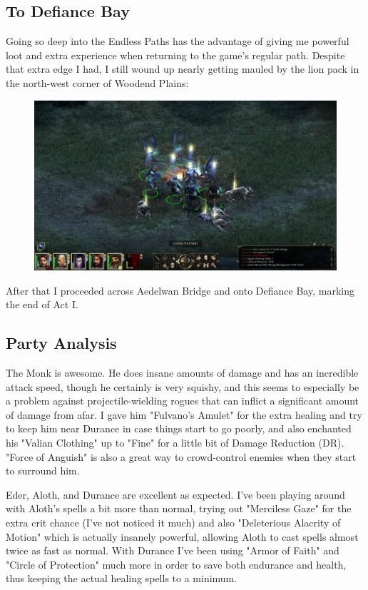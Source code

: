 \documentclass{article}
\begin{document}
\subsection{To Defiance Bay}
Going so deep into the Endless Paths has the advantage of giving me powerful loot and extra experience when returning to the game's regular path.  Despite that extra edge I had, I still wound up nearly getting mauled by the lion pack in the north-west corner of Woodend Plains:

\begin{figure}
\includegraphics[scale=0.33]{files/blog/2018_06_16_pillars_of_eternity_path_of_the_damned_act_i/2018_06_16_lions.jpg}
\end{figure}

After that I proceeded across Aedelwan Bridge and onto Defiance Bay, marking the end of Act I.

\subsection{Party Analysis}
The Monk is awesome.  He does insane amounts of damage and has an incredible attack speed, though he certainly is very squishy, and this seems to especially be a problem against projectile-wielding rogues that can inflict a significant amount of damage from afar.  I gave him "Fulvano's Amulet" for the extra healing and try to keep him near Durance in case things start to go poorly, and also enchanted his "Valian Clothing" up to "Fine" for a little bit of Damage Reduction (DR).  "Force of Anguish" is also a great way to crowd-control enemies when they start to surround him.

Eder, Aloth, and Durance are excellent as expected.  I've been playing around with Aloth's spells a bit more than normal, trying out "Merciless Gaze" for the extra crit chance (I've not noticed it much) and also "Deleterious Alacrity of Motion" which is actually insanely powerful, allowing Aloth to cast spells almost twice as fast as normal.  With Durance I've been using "Armor of Faith" and "Circle of Protection" much more in order to save both endurance and health, thus keeping the actual healing spells to a minimum.
\end{document}
